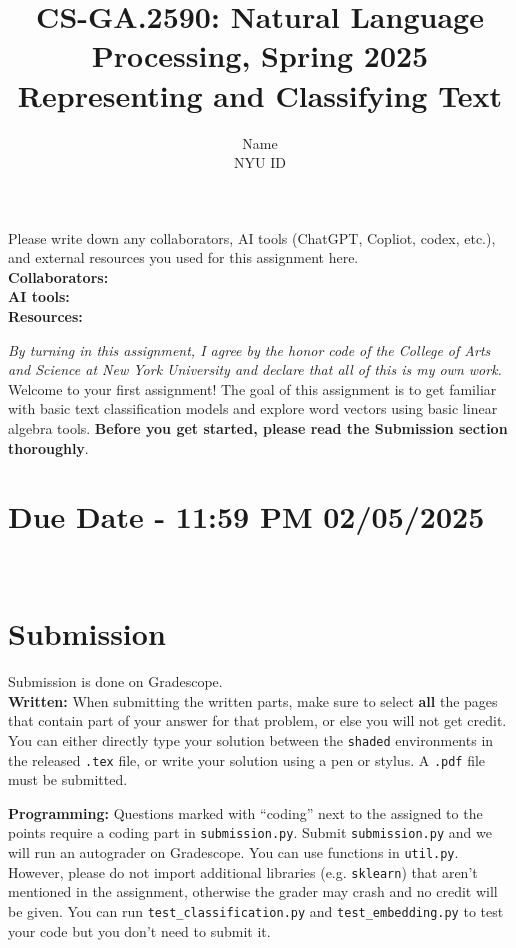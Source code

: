 \documentclass{article}
\title{\textbf{CS-GA.2590: Natural Language Processing, Spring 2025} \\Representing and Classifying Text}
\author{Name \\
NYU ID}
\date{}
\theoremstyle{case}
\theoremstyle{definition}
\begin{document}
\maketitle
\begin{tcolorbox}
Please write down any collaborators, AI tools (ChatGPT, Copliot, codex, etc.), and external resources you used for this assignment here. \\
\textbf{Collaborators:} \\
\textbf{AI tools:} \\
\textbf{Resources:} 
\end{tcolorbox}
\textit{By turning in this assignment, I agree by the honor code of the College of Arts and Science at New York University and declare
that all of this is my own work.} \\


Welcome to your first assignment! The goal of this assignment is to get familiar with basic text classification models and explore word vectors using basic linear algebra tools.
\textbf{Before you get started, please read the Submission section thoroughly}.

\section*{Due Date - 11:59 PM 02/05/2025}
\
\section*{Submission}
Submission is done on Gradescope. \\


\textbf{Written:} When submitting the written parts, make sure to select \textbf{all} the pages that contain part of your answer for that problem, or else you will not get credit.
You can either directly type your solution between the \texttt{shaded} environments in the released \texttt{.tex} file,
or write your solution using a pen or stylus. 
A \texttt{.pdf} file must be submitted.

\textbf{Programming:} Questions marked with ``coding'' next to the assigned to the points require a coding part in \texttt{submission.py}.
Submit \texttt{submission.py} and we will run an autograder on Gradescope. You can use functions in \texttt{util.py}. However, please do not import additional libraries (e.g. \texttt{sklearn}) that aren't mentioned in the assignment, otherwise the grader may crash and no credit will be given.
You can run \texttt{test\_classification.py} and \texttt{test\_embedding.py} to test your code but you don't need to submit it.
\end{document}
